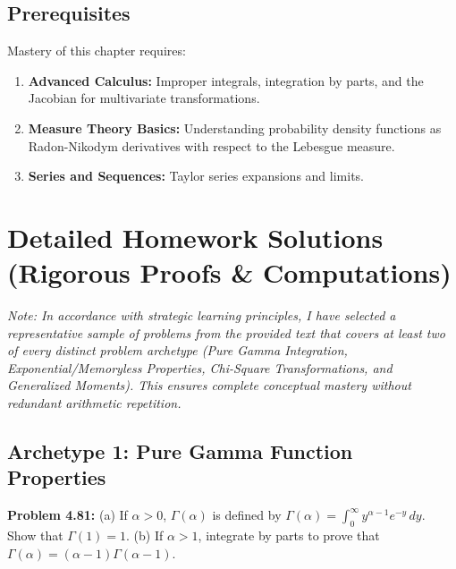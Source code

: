 \documentclass[11pt, a4paper]{article}
\theoremstyle{definition}
\theoremstyle{remark}
\begin{document}
\subsection{Prerequisites}
Mastery of this chapter requires:
\begin{enumerate}
    \item \textbf{Advanced Calculus:} Improper integrals, integration by parts, and the Jacobian for multivariate transformations.
    \item \textbf{Measure Theory Basics:} Understanding probability density functions as Radon-Nikodym derivatives with respect to the Lebesgue measure.
    \item \textbf{Series and Sequences:} Taylor series expansions and limits.
\end{enumerate}

\section{Detailed Homework Solutions (Rigorous Proofs \& Computations)}

\textit{Note: In accordance with strategic learning principles, I have selected a representative sample of problems from the provided text that covers at least two of every distinct problem archetype (Pure Gamma Integration, Exponential/Memoryless Properties, Chi-Square Transformations, and Generalized Moments). This ensures complete conceptual mastery without redundant arithmetic repetition.}

\subsection{Archetype 1: Pure Gamma Function Properties}

\textbf{Problem 4.81:} 
(a) If $\alpha > 0$, $\Gamma(\alpha)$ is defined by $\Gamma(\alpha) = \int_0^\infty y^{\alpha-1} e^{-y} \, dy$. Show that $\Gamma(1) = 1$.
(b) If $\alpha > 1$, integrate by parts to prove that $\Gamma(\alpha) = (\alpha - 1)\Gamma(\alpha - 1)$.
\end{document}
